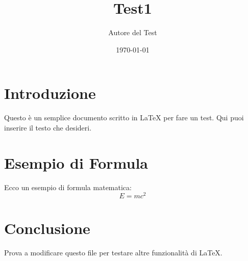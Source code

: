 \documentclass[a4paper,12pt]{article}
\title{Test1}
\author{Autore del Test}
\date{\today} %
\begin{document}
\maketitle

\section{Introduzione}
Questo è un semplice documento scritto in \LaTeX{} per fare un test. Qui puoi inserire il testo che desideri.

\section{Esempio di Formula}
Ecco un esempio di formula matematica:
\[
E = mc^2
\]

\section{Conclusione}
Prova a modificare questo file per testare altre funzionalità di \LaTeX.
\end{document}
